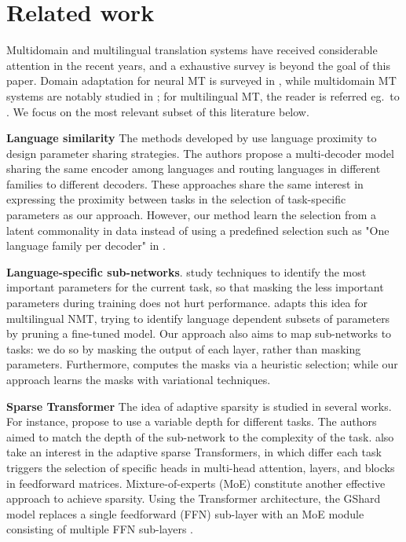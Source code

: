 \documentclass[11pt]{article}
\begin{document}
\section{Related work}\label{sec:related}
Multidomain and multilingual translation systems have received considerable attention in the recent years, and a exhaustive survey is beyond the goal of this paper. Domain adaptation for neural MT is surveyed in \citep{Chu17comparison}, while multidomain MT systems are notably studied in \cite{Saunders21Asurvey,Pham21revisiting}; for multilingual MT, the reader is referred eg.\ to \citep{Chu18multilingual,dabre20survey}. We focus on the most relevant subset of this literature below.

\textbf{Language similarity} The methods developed by \citep{sen19multilingual,kong21multilingual} use language proximity to design parameter sharing strategies. The authors propose a multi-decoder model sharing the same encoder among languages and routing languages in different families to different decoders. These approaches share the same interest in expressing the proximity between tasks in the selection of task-specific parameters as our approach. However, our method learn the selection from a latent commonality in data instead of using a predefined selection such as "One language family per decoder" in \citep{kong21multilingual}.

\textbf{Language-specific sub-networks}. \done\todo{}\citet{Frankle19Lottery,liu18rethinking} study techniques to identify the most important parameters for the current task, so that masking the less important parameters during training does not hurt performance. \citet{lin21learning} adapts this idea for multilingual NMT, trying to identify language dependent subsets of parameters by pruning a fine-tuned model. Our approach also aims to map sub-networks to tasks: we do so by masking the output of each layer, rather than masking parameters. Furthermore, \citet{lin21learning} computes the masks via a heuristic selection; while our approach learns the masks with variational techniques.

\textbf{Sparse Transformer} The idea of adaptive sparsity is studied in several works. For instance, \citet{xian20deep} propose to use a variable depth for different tasks. The authors aimed to match the depth of the sub-network to the complexity of the task. \citet{Gong21pay,Gong21adaptive} also take an interest in the adaptive sparse Transformers, in which differ each task triggers the selection of specific heads in multi-head attention, layers, and blocks in feedforward matrices. Mixture-of-experts (MoE) constitute another effective approach to achieve sparsity. Using the Transformer architecture, the GShard model replaces a single feedforward (FFN) sub-layer with an MoE module consisting of multiple FFN sub-layers \citep{lepikhin21gshard,william21switch}.
\end{document}
